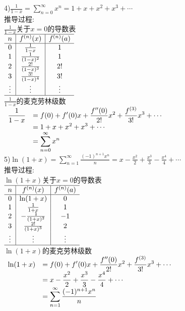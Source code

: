 4)\quad$\displaystyle\frac{1}{1-x}=\sum_{n=0}^{\infty}x^n=1+x+x^2+x^3+\cdots$\\[1ex]
推导过程:\\
$\displaystyle\frac{1}{1-x}$关于$x=0$的导数表\\[1ex]
$\begin{array}{c|c|c}
\hline
n & f^{(n)}(x) & f^{(n)}(a)\\
\hline
0 & \frac{1}{1-x} & 1\\
1 & \frac{1}{(1-x)^2} & 1\\
2 & \frac{2!}{(1-x)^3} & 2!\\
3 & \frac{3!}{(1-x)^4} & 3!\\
\vdots & \vdots & \vdots\\
\hline
\end{array}$\\[1ex]
$\displaystyle\frac{1}{1-x}$的麦克劳林级数\\
$\begin{array}{>{\displaystyle}r >{\displaystyle}l}
\frac{1}{1-x} & =f(0)+f'(0)x+\frac{f''(0)}{2!}x^2+\frac{f^{(3)}}{3!}x^3+\cdots\\
& =1+x+x^2+x^3+\cdots\\
& =\sum_{n=0}^{\infty}x^n
\end{array}$\\[1ex]

5)\quad$\displaystyle\ln(1+x)=\sum_{n=1}^{\infty}\frac{(-1)^{n+1}x^n}{n}=x-\frac{x^2}{2}+\frac{x^3}{3}-\frac{x^4}{4}+\cdots$\\[1ex]
推导过程:\\
$\ln(1+x)$关于$x=0$的导数表\\[1ex]
$\begin{array}{c|c|c}
\hline
n & f^{(n)}(x) & f^{(n)}(a)\\
\hline
0 & \ln(1+x) & 0\\
1 & \frac{1}{1+x} & 1\\
2 & -\frac{1}{(1+x)^2} & -1\\
3 & \frac{2!}{(1+x)^3} & 2\\
\vdots & \vdots & \vdots\\
\hline
\end{array}$\\[1ex]
$\ln(1+x)$的麦克劳林级数\\
$\begin{array}{>{\displaystyle}r >{\displaystyle}l}
\ln(1+x) & =f(0)+f'(0)x+\frac{f''(0)}{2!}x^2+\frac{f^{(3)}}{3!}x^3+\cdots\\
& =x-\frac{x^2}{2}+\frac{x^3}{3}-\frac{x^4}{4}+\cdots\\
& =\sum_{n=1}^{\infty}\frac{(-1)^{n+1}x^n}{n}
\end{array}$\\[1ex]

